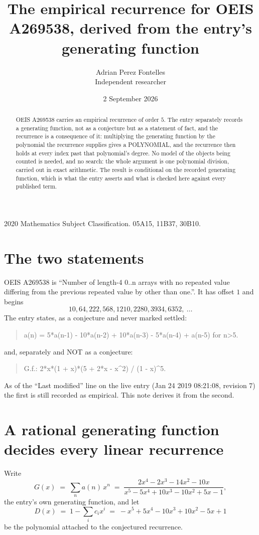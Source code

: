 \documentclass[11pt,a4paper]{article}
\title{The empirical recurrence for OEIS A269538, derived from the entry's generating function}
\author{Adrian Perez Fontelles\\ \small Independent researcher}
\date{2 September 2026}
\theoremstyle{plain}
\theoremstyle{definition}
\begin{document}
\maketitle

\begin{abstract}
OEIS A269538 carries an empirical recurrence of order $5$. The entry separately records a
generating function, not as a conjecture but as a statement of fact, and the recurrence is a
consequence of it: multiplying the generating function by the polynomial the recurrence
supplies gives a POLYNOMIAL, and the recurrence then holds at every index past that
polynomial's degree. No model of the objects being counted is needed, and no search: the
whole argument is one polynomial division, carried out in exact arithmetic. The result is
conditional on the recorded generating function, which is what the entry asserts and what is
checked here against every published term.
\end{abstract}

\noindent\small 2020 Mathematics Subject Classification. 05A15, 11B37, 30B10.\normalsize

\section{The two statements}

OEIS A269538 is ``Number of length-4 0..n arrays with no repeated value differing from the previous repeated value by other than one.''. It has offset $1$ and begins
\[
10, 64, 222, 568, 1210, 2280, 3934, 6352,\ \dots
\]
The entry states, as a conjecture and never marked settled:
\begin{quote}
a(n) = 5*a(n-1) - 10*a(n-2) + 10*a(n-3) - 5*a(n-4) + a(n-5) for n>5.
\end{quote}
and, separately and NOT as a conjecture:
\begin{quote}
G.f.: 2*x*(1 + x)*(5 + 2*x - x\^{}2) / (1 - x)\^{}5.
\end{quote}
As of the ``Last modified'' line on the live entry (Jan 24 2019 08:21:08, revision 7) the first is still
recorded as empirical. This note derives it from the second.

\section{A rational generating function decides every linear recurrence}

Write
\[
G(x)\;=\;\sum_{n}a(n)\,x^{n}\;=\;\frac{2 x^{4} - 2 x^{3} - 14 x^{2} - 10 x}{x^{5} - 5 x^{4} + 10 x^{3} - 10 x^{2} + 5 x - 1},
\]
the entry's own generating function, and let
\[
D(x)\;=\;1-\sum_i c_i x^{i}\;=\;- x^{5} + 5 x^{4} - 10 x^{3} + 10 x^{2} - 5 x + 1
\]
be the polynomial attached to the conjectured recurrence.
\end{document}
